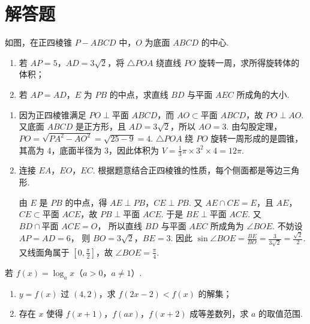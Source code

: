 \section{解答题}

\begin{problem}
如图，在正四棱锥 \(P-ABCD\) 中，\(O\) 为底面 \(ABCD\) 的中心.

\begin{enumerate}
\item 若 \(AP=5\)，\(AD=3\sqrt{2}\)，将 \(\triangle POA\) 绕直线 \(PO\) 旋转一周，求所得旋转体的体积；
\item 若 \(AP=AD\)，\(E\) 为 \(PB\) 的中点，求直线 \(BD\) 与平面 \(AEC\) 所成角的大小.
\end{enumerate}

\end{problem}

\begin{solution}
\begin{enumerate}
\item 因为正四棱锥满足 \(PO\perp \text{平面 }ABCD\)，而 \(AO\subset \text{平面 }ABCD\)，故
\(PO\perp AO\).
又底面 \(ABCD\) 是正方形，且 \(AD=3\sqrt{2}\)，所以
\(AO=3\).
由勾股定理，
\(PO=\sqrt{PA^2-AO^2}=\sqrt{25-9}=4\).
\(\triangle POA\) 绕 \(PO\) 旋转一周形成的是圆锥，其高为 4，底面半径为 3，因此体积为
\(V=\frac{1}{3}\pi\times 3^2\times 4=12\pi\).

\item 连接 \(EA\)，\(EO\)，\(EC\). 根据题意结合正四棱锥的性质，每个侧面都是等边三角形.


由 \(E\) 是 \(PB\) 的中点，得
\(AE\perp PB\)，\(CE\perp PB\).
又 \(AE\cap CE=E\)，且 \(AE\)，\(CE\subset \text{平面 }ACE\)，故
\(PB\perp \text{平面 }ACE\).
于是 \(BE\perp \text{平面 }ACE\). 又
\(BD\cap \text{平面 }ACE=O\)，
所以直线 \(BD\) 与平面 \(AEC\) 所成角为 \(\angle BOE\).
不妨设
\(AP=AD=6\)，
则
\(BO=3\sqrt{2}\)，\(BE=3\).
因此
\(\sin \angle BOE=\frac{BE}{BO}=\frac{3}{3\sqrt{2}}=\frac{\sqrt{2}}{2}\).
又线面角属于 \(\left[ 0,\frac{\pi}{2} \right]\)，故
\(\angle BOE=\frac{\pi}{4}\).
\end{enumerate}
\end{solution}

\begin{problem}
若 \(f(x)=\log_a x\)（\(a>0\)，\(a\ne 1\)）.

\begin{enumerate}
\item \(y=f(x)\) 过 \((4,2)\)，求 \(f(2x-2)<f(x)\) 的解集；
\item 存在 \(x\) 使得 \(f(x+1)\)，\(f(ax)\)，\(f(x+2)\) 成等差数列，求 \(a\) 的取值范围.
\end{enumerate}
\end{problem}

